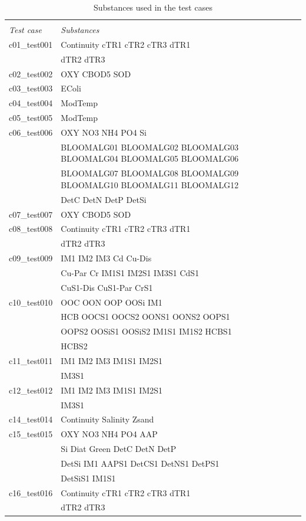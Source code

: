 
\begin{longtable}{ll}
\caption{Substances used in the test cases} \\
\hline \\
\emph{Test case} & \emph{Substances} \\
\hline
c01\_test001 & Continuity cTR1 cTR2 cTR3 dTR1 \\ 
 & dTR2 dTR3 \\
c02\_test002 & OXY CBOD5 SOD \\
c03\_test003 & EColi \\
c04\_test004 & ModTemp \\
c05\_test005 & ModTemp \\
c06\_test006 & OXY NO3 NH4 PO4 Si \\ 
 & BLOOMALG01 BLOOMALG02 BLOOMALG03 BLOOMALG04 BLOOMALG05 BLOOMALG06 \\ 
 & BLOOMALG07 BLOOMALG08 BLOOMALG09 BLOOMALG10 BLOOMALG11 BLOOMALG12 \\ 
 & DetC DetN DetP DetSi \\
c07\_test007 & OXY CBOD5 SOD \\
c08\_test008 & Continuity cTR1 cTR2 cTR3 dTR1 \\ 
 & dTR2 dTR3 \\
c09\_test009 & IM1 IM2 IM3 Cd Cu-Dis \\ 
 & Cu-Par Cr IM1S1 IM2S1 IM3S1 CdS1 \\ 
 & CuS1-Dis CuS1-Par CrS1 \\
c10\_test010 & OOC OON OOP OOSi IM1 \\ 
 & HCB OOCS1 OOCS2 OONS1 OONS2 OOPS1 \\ 
 & OOPS2 OOSiS1 OOSiS2 IM1S1 IM1S2 HCBS1 \\ 
 & HCBS2 \\
c11\_test011 & IM1 IM2 IM3 IM1S1 IM2S1 \\ 
 & IM3S1 \\
c12\_test012 & IM1 IM2 IM3 IM1S1 IM2S1 \\ 
 & IM3S1 \\
c14\_test014 & Continuity Salinity Zsand \\
c15\_test015 & OXY NO3 NH4 PO4 AAP \\ 
 & Si Diat Green DetC DetN DetP \\ 
 & DetSi IM1 AAPS1 DetCS1 DetNS1 DetPS1 \\ 
 & DetSiS1 IM1S1 \\
c16\_test016 & Continuity cTR1 cTR2 cTR3 dTR1 \\ 
 & dTR2 dTR3 \\

\end{longtable}
